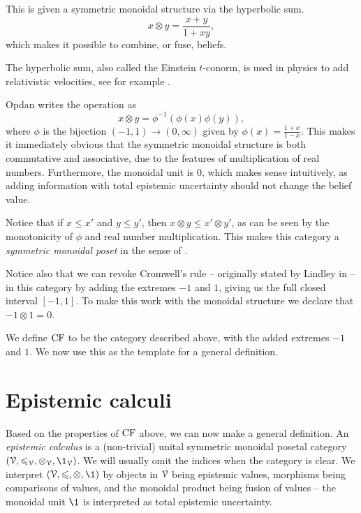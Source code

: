 This is given a symmetric monoidal structure via the hyperbolic sum. 
\[x\otimes y = \frac{x+y}{1+xy},\]
which makes it possible to combine, or fuse, beliefs. 

\begin{remark}
    The hyperbolic sum, also called the Einstein $t$-conorm, is used in physics to add relativistic velocities, see for example \cite{parker-jeynes-walker_2025}.
\end{remark}

Opdan writes the operation as
\[x\otimes y = \phi^{-1}(\phi(x)\phi(y)),\] 
where $\phi$ is the bijection $(-1,1) \to (0,\infty)$ given by $\phi(x)=\frac{1+x}{1-x}$. This makes it immediately obvious that the symmetric monoidal structure is both commutative and associative, due to the features of multiplication of real numbers. Furthermore, the monoidal unit is $0$, which makes sense intuitively, as adding information with total epistemic uncertainty should not change the belief value. 

Notice that if $x\leq x'$ and $y\leq y'$, then $x\otimes y \leq x'\otimes y'$, as can be seen by the monotonicity of $\phi$ and real number multiplication. This makes this category a \emph{symmetric monoidal poset} in the sense of \cite{fong-spivak_2019}.

Notice also that we can revoke Cromwell's rule -- originally stated by Lindley in \cite{lindley_1991} -- in this category by adding the extremes $-1$ and $1$, giving us the full closed interval $[-1,1]$. To make this work with the monoidal structure we declare that $-1\otimes 1 = 0$. 

We define $\mathrm{CF}$ to be the category described above, with the added extremes $-1$ and $1$. We now use this as the template for a general definition. 




\section{Epistemic calculi}
Based on the properties of $\mathrm{CF}$ above, we can now make a general definition. An \emph{epistemic calculus} is a (non-trivial) unital symmetric monoidal posetal category $(\V, \leq_\V, \otimes_\V, \1_\V)$. We will usually omit the indices when the category is clear. We interpret $(\V, \leq, \otimes, \1)$ by objects in $\EuScript{V}$ being epistemic values, morphisms being comparisons of values, and the monoidal product being fusion of values -- the monoidal unit $\1$ is interpreted as total epistemic uncertainty.

